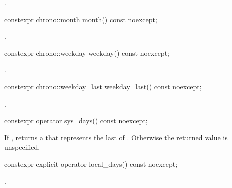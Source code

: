 \begin{itemdescr}
\pnum
\returns
{}.
\end{itemdescr}

%
\begin{itemdecl}
constexpr chrono::month month() const noexcept;
\end{itemdecl}

\begin{itemdescr}
\pnum
\returns
{}.
\end{itemdescr}

%
\begin{itemdecl}
constexpr chrono::weekday weekday() const noexcept;
\end{itemdecl}

\begin{itemdescr}
\pnum
\returns
{}.
\end{itemdescr}

%
\begin{itemdecl}
constexpr chrono::weekday_last weekday_last() const noexcept;
\end{itemdecl}

\begin{itemdescr}
\pnum
\returns
{}.
\end{itemdescr}

%
\begin{itemdecl}
constexpr operator sys_days() const noexcept;
\end{itemdecl}

\begin{itemdescr}
\pnum
\returns
If ,
returns a  that represents
the last  of .
Otherwise the returned value is unspecified.
\end{itemdescr}

%
\begin{itemdecl}
constexpr explicit operator local_days() const noexcept;
\end{itemdecl}

\begin{itemdescr}
\pnum
\returns
{}.
\end{itemdescr}

